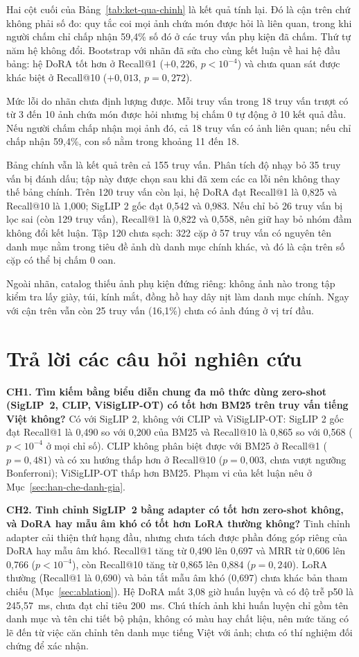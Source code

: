 Hai cột cuối của Bảng~\ref{tab:ket-qua-chinh} là kết quả tính lại. Đó là cận trên chứ không phải số đo: quy tắc coi mọi ảnh chứa món được hỏi là liên quan, trong khi người chấm chỉ chấp nhận 59,4\% số đó ở các truy vấn phụ kiện đã chấm. Thứ tự năm hệ không đổi. Bootstrap với nhãn đã sửa cho cùng kết luận về hai hệ đầu bảng: hệ DoRA tốt hơn ở Recall@1 ($+0{,}226$, $p < 10^{-4}$) và chưa quan sát được khác biệt ở Recall@10 ($+0{,}013$, $p = 0{,}272$).

Mức lỗi do nhãn chưa định lượng được. Mỗi truy vấn trong 18 truy vấn trượt có từ 3 đến 10 ảnh chứa món được hỏi nhưng bị chấm 0 tự động ở 10 kết quả đầu. Nếu người chấm chấp nhận mọi ảnh đó, cả 18 truy vấn có ảnh liên quan; nếu chỉ chấp nhận 59,4\%, con số nằm trong khoảng 11 đến 18.

Bảng chính vẫn là kết quả trên cả 155 truy vấn. Phân tích độ nhạy bỏ 35 truy vấn bị đánh dấu; tập này được chọn sau khi đã xem các ca lỗi nên không thay thế bảng chính. Trên 120 truy vấn còn lại, hệ DoRA đạt Recall@1 là 0,825 và Recall@10 là 1,000; SigLIP 2 gốc đạt 0,542 và 0,983. Nếu chỉ bỏ 26 truy vấn bị lọc sai (còn 129 truy vấn), Recall@1 là 0,822 và 0,558, nên giữ hay bỏ nhóm đầm không đổi kết luận. Tập 120 chưa sạch: 322 cặp ở 57 truy vấn có nguyên tên danh mục nằm trong tiêu đề ảnh dù danh mục chính khác, và đó là cận trên số cặp có thể bị chấm 0 oan.

Ngoài nhãn, catalog thiếu ảnh phụ kiện đứng riêng: không ảnh nào trong tập kiểm tra lấy giày, túi, kính mắt, đồng hồ hay dây nịt làm danh mục chính. Ngay với cận trên vẫn còn 25 truy vấn (16,1\%) chưa có ảnh đúng ở vị trí đầu.

\section{Trả lời các câu hỏi nghiên cứu}
\label{sec:tra-loi-ch}

\textbf{CH1. Tìm kiếm bằng biểu diễn chung đa mô thức dùng zero-shot (SigLIP~2, CLIP, ViSigLIP-OT) có tốt hơn BM25 trên truy vấn tiếng Việt không?} Có với SigLIP 2, không với CLIP và ViSigLIP-OT: SigLIP 2 gốc đạt Recall@1 là 0,490 so với 0,200 của BM25 và Recall@10 là 0,865 so với 0,568 ($p < 10^{-4}$ ở mọi chỉ số). CLIP không phân biệt được với BM25 ở Recall@1 ($p = 0{,}481$) và có xu hướng thấp hơn ở Recall@10 ($p = 0{,}003$, chưa vượt ngưỡng Bonferroni); ViSigLIP-OT thấp hơn BM25. Phạm vi của kết luận nêu ở Mục~\ref{sec:han-che-danh-gia}.

\textbf{CH2. Tinh chỉnh SigLIP~2 bằng adapter có tốt hơn zero-shot không, và DoRA hay mẫu âm khó có tốt hơn LoRA thường không?} Tinh chỉnh adapter cải thiện thứ hạng đầu, nhưng chưa tách được phần đóng góp riêng của DoRA hay mẫu âm khó. Recall@1 tăng từ 0,490 lên 0,697 và MRR từ 0,606 lên 0,766 ($p < 10^{-4}$), còn Recall@10 tăng từ 0,865 lên 0,884 ($p = 0{,}240$). LoRA thường (Recall@1 là 0,690) và bản tắt mẫu âm khó (0,697) chưa khác bản tham chiếu (Mục~\ref{sec:ablation}). Hệ DoRA mất 3,08 giờ huấn luyện và có độ trễ p50 là 245,57~ms, chưa đạt chỉ tiêu 200~ms. Chú thích ảnh khi huấn luyện chỉ gồm tên danh mục và tên chi tiết bộ phận, không có màu hay chất liệu, nên mức tăng có lẽ đến từ việc căn chỉnh tên danh mục tiếng Việt với ảnh; chưa có thí nghiệm đối chứng để xác nhận.

